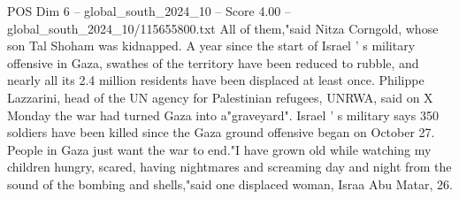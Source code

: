 \begin{textsample}{POS Dim 6 – global\_south\_2024\_10 – Score 4.00 – global\_south\_2024\_10/115655800.txt}
All of them,"said Nitza Corngold, whose son Tal Shoham was kidnapped.
A year since the start of Israel ' s military offensive in Gaza, swathes of the territory have been reduced to rubble, and nearly all its 2.4 million residents have been displaced at least once.
Philippe Lazzarini, head of the UN agency for Palestinian refugees, UNRWA, said on X Monday the war had turned Gaza into a"graveyard".
Israel ' s military says 350 soldiers have been killed since the Gaza ground offensive began on October 27.
People in Gaza just want the war to end."I have grown old while watching my children hungry, scared, having nightmares and screaming day and night from the sound of the bombing and shells,"said one displaced woman, Israa Abu Matar, 26.

\end{textsample}
